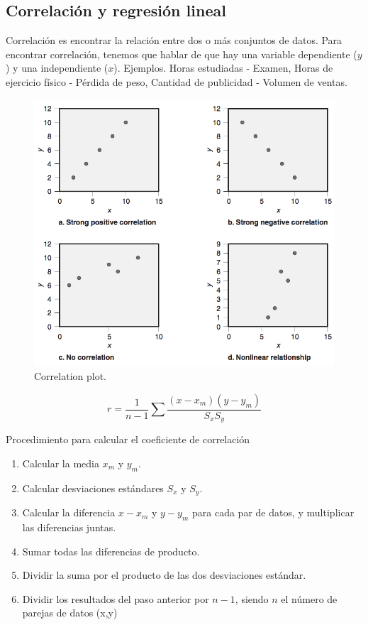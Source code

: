 \documentclass[]{article}
\begin{document}
\subsection{Correlación y regresión lineal}

Correlación es encontrar la relación entre dos o más conjuntos de datos. Para encontrar correlación, tenemos que hablar de que hay una variable dependiente ($y$) y una independiente ($x$). Ejemplos. Horas estudiadas - Examen, Horas de ejercicio físico - Pérdida de peso, Cantidad de publicidad - Volumen de ventas.

\begin{figure}[H]
	\centering
	\includegraphics[width=120mm]{imagenes/Correlation.png}
	\caption{Correlation plot.}
	\label{fig:Correlation}
\end{figure}

\begin{equation}
r = \frac{1}{n-1} \sum \frac{(x-x_m)(y-y_m)}{S_xS_y}
\end{equation}

Procedimiento para calcular el coeficiente de correlación

\begin{enumerate}
	\item Calcular la media $x_m$ y $y_m$.
	\item Calcular desviaciones estándares $S_x$ y $S_y$.
	\item Calcular la diferencia $x-x_m$ y $y-y_m$ para cada par de datos, y multiplicar las diferencias juntas.
	\item Sumar todas las diferencias de producto. 
	\item Dividir la suma por el producto de las dos desviaciones estándar. 
	\item Dividir los resultados del paso anterior por $n-1$, siendo $n$ el número de parejas de datos (x,y)
\end{enumerate}
\end{document}
